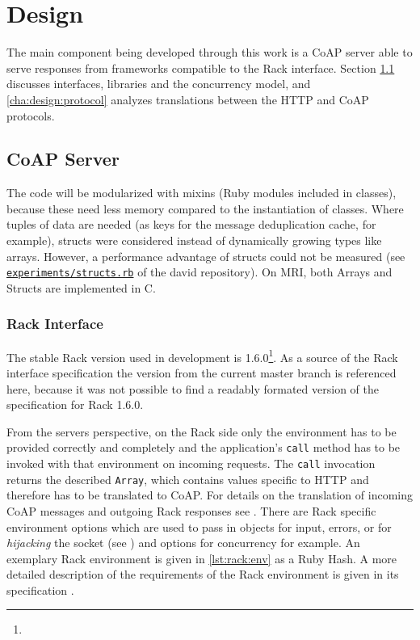 \chapter{Design}
\label{cha:design}

The main component being developed through this work is a \ac{CoAP} server able
to serve responses from frameworks compatible to the Rack interface. Section
\ref{cha:design:server} discusses interfaces, libraries and the concurrency
model, and \autoref{cha:design:protocol} analyzes translations between the
\ac{HTTP} and \ac{CoAP} protocols.

\section{\acs{CoAP} Server}
\label{cha:design:server}

	The code will be modularized with mixins (Ruby modules included in
	classes), because these need less memory compared to the instantiation of
	classes. Where tuples of data are needed (as keys for the message
	deduplication cache, for example), structs were considered instead of
	dynamically growing types like arrays. However, a performance advantage of
	structs could not be measured (see
	\href{https://github.com/nning/david/blob/master/experiments/structs.rb}{\texttt{experiments/structs.rb}}
	of the david repository). On \ac{MRI}, both Arrays and Structs are
	implemented in C.

	\subsection{Rack Interface}
	\label{cha:design:server:rack}

		The stable Rack version used in development is
		1.6.0\footnote{\urlRack}. As a source of the Rack interface
		specification the version from the current master branch \cite{rack} is
		referenced here, because it was not possible to find a readably
		formated version of the specification for Rack 1.6.0.
		
		From the servers perspective, on the Rack side only the environment has
		to be provided correctly and completely and the application's
		\texttt{call} method has to be invoked with that environment on
		incoming requests. The \texttt{call} invocation returns the described
		\texttt{Array}, which contains values specific to \ac{HTTP} and
		therefore has to be translated to \ac{CoAP}. For details on the
		translation of incoming \ac{CoAP} messages and outgoing Rack responses
		see . There are Rack specific environment
		options which are used to pass in objects for input, errors, or for
		\emph{hijacking} the socket (see )
		and options for concurrency for example. An exemplary Rack environment
		is given in \autoref{lst:rack:env} as a Ruby Hash. A more detailed
		description of the requirements of the Rack environment is given in its
		specification \cite{rack}.

